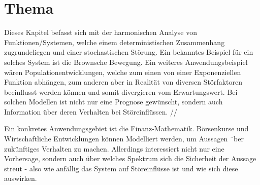 %
%
%
%
\chapter{Thema\label{chapter:brown}}
\begin{refsection}

Dieses Kapitel befasst sich mit der harmonischen Analyse von Funktionen/Systemen, welche einem deterministischen Zusammenhang zugrundeliegen und einer stochastischen Störung. Ein bekanntes Beispiel für ein solches System ist die Brownsche Bewegung. Ein weiteres Anwendungsbeispiel wären Populationentwicklungen, welche zum einen von einer Exponenziellen Funktion abhängen, zum anderen aber in Realität von diversen Störfaktoren beeinflusst werden können und somit divergieren vom Erwartungswert. Bei solchen Modellen ist nicht nur eine Prognose gewünscht, sondern auch Information über deren Verhalten bei Störeinflüssen.
//


Ein konkretes Anwendungsgebiet ist die Finanz-Mathematik. Börsenkurse und Wirtschaftliche Entwicklungen können Modelliert werden, um Aussagen ¨ber zukünftiges Verhalten zu machen. Allerdings interessiert nicht nur eine Vorhersage, sondern auch über welches Spektrum sich die Sicherheit der Aussage streut - also wie anfällig das System auf Störeinflüsse ist und wie sich diese auswirken.






\printbibliography[heading=subbibliography]
\end{refsection}
